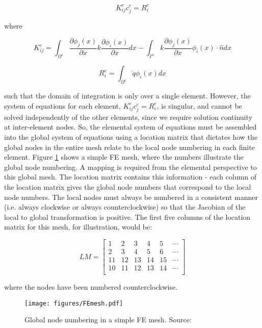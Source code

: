 \documentclass[10pt]{article}
\newcommand{\beq}{\begin{equation}}
\newcommand{\eeq}{\end{equation}}
\begin{document}
\beq
K_{ij}^ec_j^e=R_i^e
\eeq

where

\beq
K_{ij}^e=\int_{\Omega^e}\frac{\partial \phi_j(x)}{\partial x}k\frac{\partial\phi_i(x)}{\partial x}dx-\int_{\Gamma^e}k\frac{\partial \phi_j(x)}{\partial x}\phi_i(x)\cdot\hat{n}dx
\eeq

\beq
R_{i}^e=\int_{\Omega^e}\dot{q}\phi_i(x)dx
\eeq

such that the domain of integration is only over a single element. However, the system of equations for each element, \(K_{ij}^ec_j^e=R_i^e\), is singular, and cannot be solved independently of the other elements, since we require solution continuity at inter-element nodes. So, the elemental system of equations must be assembled into the global system of equations using a location matrix that dictates how the global nodes in the entire mesh relate to the local node numbering in each finite element. Figure \ref{fig:FEmesh} shows a simple FE mesh, where the numbers illustrate the global node numbering. A mapping is required from the elemental perspective to this global mesh. The location matrix contains this information - each column of the location matrix gives the global node numbers that correspond to the local node numbers. The local nodes must always be numbered in a consistent manner (i.e. always clockwise or always counterclockwise) so that the Jacobian of the local to global transformation is positive. The first five columns of the location matrix for this mesh, for illustration, would be:

\beq
\label{eq:LM}
LM=\begin{bmatrix}
1 & 2 & 3 & 4 & 5 & \cdots\\
2 & 3 & 4 & 5 & 6 & \cdots\\
11 & 12 & 13 & 14 & 15 & \cdots\\
10 & 11 & 12 & 13 & 14 & \cdots\\
\end{bmatrix}
\eeq

where the nodes have been numbered counterclockwise.

\begin{figure}[H]
\centering
\texttt{[image: figures/FEmesh.pdf]}
\caption{Global node numbering in a simple FE mesh. Source:}
\label{fig:FEmesh}
\end{figure}
\end{document}
